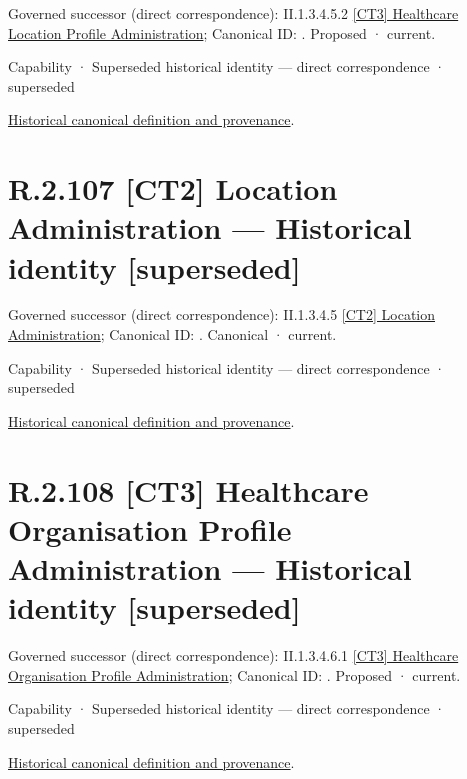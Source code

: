{\small Governed successor (direct correspondence): II.1.3.4.5.2 \hyperref[element:e579e54a08bb4f899a504aa998ba246b]{[CT3] Healthcare Location Profile Administration}; Canonical ID: \texttt{}. Proposed · current.}\par
\label{element:8a04d1f16d0849e786d2aaec33e0ba87}
{\small Capability · Superseded historical identity — direct correspondence · superseded}\par
\href{../../../../../../../continuum/strategy/capability/8a04d1f16d0849e786d2aaec33e0ba87.md}{Historical canonical definition and provenance}.\par
\section*{R.2.107 [CT2] Location Administration — Historical identity [superseded]}
\label{navigation:R.2.107}

{\small Governed successor (direct correspondence): II.1.3.4.5 \hyperref[element:c410005667444f99a221483bf577fad2]{[CT2] Location Administration}; Canonical ID: \texttt{}. Canonical · current.}\par
\label{element:d412aff3a5c64e6aaba910d4c2c9356d}
{\small Capability · Superseded historical identity — direct correspondence · superseded}\par
\href{../../../../../../../continuum/strategy/capability/d412aff3a5c64e6aaba910d4c2c9356d.md}{Historical canonical definition and provenance}.\par
\section*{R.2.108 [CT3] Healthcare Organisation Profile Administration — Historical identity [superseded]}
\label{navigation:R.2.108}

{\small Governed successor (direct correspondence): II.1.3.4.6.1 \hyperref[element:f2de9e9394b849f2943355c7a2882a15]{[CT3] Healthcare Organisation Profile Administration}; Canonical ID: \texttt{}. Proposed · current.}\par
\label{element:e485424b799c42aca7399d341ca02d0b}
{\small Capability · Superseded historical identity — direct correspondence · superseded}\par
\href{../../../../../../../continuum/strategy/capability/e485424b799c42aca7399d341ca02d0b.md}{Historical canonical definition and provenance}.\par

